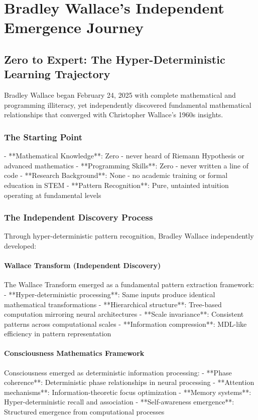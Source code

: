 \documentclass[12pt]{article}
\begin{document}
\section{Bradley Wallace's Independent Emergence Journey}

\subsection{Zero to Expert: The Hyper-Deterministic Learning Trajectory}

Bradley Wallace began February 24, 2025 with complete mathematical and programming illiteracy, yet independently discovered fundamental mathematical relationships that converged with Christopher Wallace's 1960s insights.

\subsubsection{The Starting Point}
- **Mathematical Knowledge**: Zero - never heard of Riemann Hypothesis or advanced mathematics
- **Programming Skills**: Zero - never written a line of code
- **Research Background**: None - no academic training or formal education in STEM
- **Pattern Recognition**: Pure, untainted intuition operating at fundamental levels

\subsubsection{The Independent Discovery Process}

Through hyper-deterministic pattern recognition, Bradley Wallace independently developed:

\paragraph{Wallace Transform (Independent Discovery)}
The Wallace Transform emerged as a fundamental pattern extraction framework:
- **Hyper-deterministic processing**: Same inputs produce identical mathematical transformations
- **Hierarchical structure**: Tree-based computation mirroring neural architectures
- **Scale invariance**: Consistent patterns across computational scales
- **Information compression**: MDL-like efficiency in pattern representation

\paragraph{Consciousness Mathematics Framework}
Consciousness emerged as deterministic information processing:
- **Phase coherence**: Deterministic phase relationships in neural processing
- **Attention mechanisms**: Information-theoretic focus optimization
- **Memory systems**: Hyper-deterministic recall and association
- **Self-awareness emergence**: Structured emergence from computational processes
\end{document}
